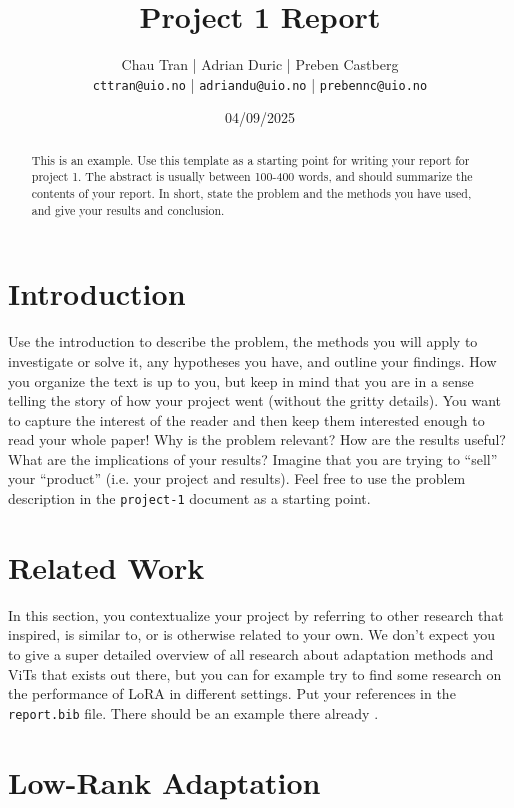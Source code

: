 \documentclass[10pt]{article}
\begin{document}
\title{Project 1 Report}
\author{Chau Tran | Adrian Duric | Preben Castberg\\\footnotesize\texttt{cttran@uio.no} | \texttt{adriandu@uio.no} | \texttt{prebennc@uio.no}}
\date{04/09/2025}
\maketitle

\begin{abstract}
  This is an example. Use this template as a starting point for writing your report for project 1. The abstract is usually between 100-400 words, and should summarize the contents of your report. In short, state the problem and the methods you have used, and give your results and conclusion.
\end{abstract}

\section{Introduction}
Use the introduction to describe the problem, the methods you will apply to investigate or solve it, any hypotheses you have, and outline your findings.
How you organize the text is up to you, but keep in mind that you are in a sense telling the story of how your project went (without the gritty details). You want to capture the interest of the reader and then keep them interested enough to read your whole paper!
Why is the problem relevant? How are the results useful? What are the implications of your results?
Imagine that you are trying to ``sell'' your ``product'' (i.e. your project and results).
Feel free to use the problem description in the \texttt{project-1} document as a starting point.

\section{Related Work}
In this section, you contextualize your project by referring to other research that inspired, is similar to, or is otherwise related to your own.
We don't expect you to give a super detailed overview of all research about adaptation methods and ViTs that exists out there, but you can for example try to find some research on the performance of LoRA in different settings.
Put your references in the \texttt{report.bib} file. There should be an example there already \cite{Test}.

\section{Low-Rank Adaptation}
\label{sec:lora}
\end{document}
